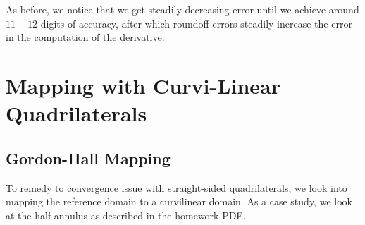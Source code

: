 \documentclass{article}
\begin{document}
\noindent As before, we notice that we get steadily decreasing error until we achieve around $11-12$ digits of accuracy, after which roundoff errors steadily increase the error in the computation of the derivative. 

\section{Mapping with Curvi-Linear Quadrilaterals}

\subsection{Gordon-Hall Mapping}
\noindent To remedy to convergence issue with straight-sided quadrilaterals, we look into mapping the reference domain to a curvilinear domain. As a case study, we look at the half annulus as described in the homework PDF. 

\end{document}
